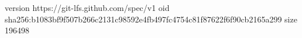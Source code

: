 version https://git-lfs.github.com/spec/v1
oid sha256:b1083bf9f507b266c2131c98592e4fb497fc4754c81f87622f6f90cb2165a299
size 196498
